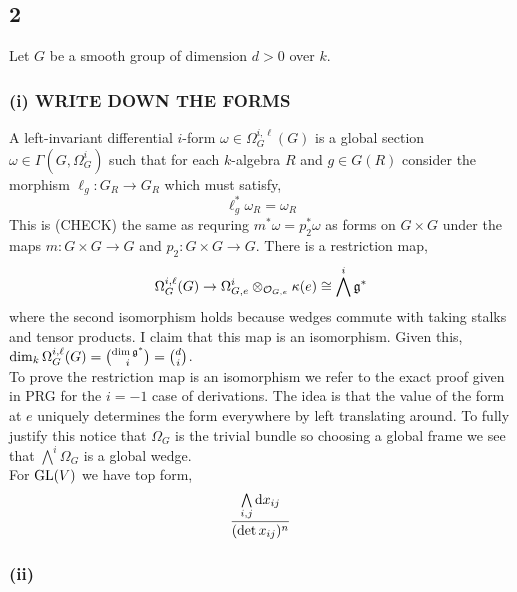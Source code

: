 \documentclass[12pt]{article}
\begin{document}
\subsection{2}

Let $G$ be a smooth group of dimension $d > 0$ over $k$.

\subsubsection{(i) WRITE DOWN THE FORMS}

A left-invariant differential $i$-form $\omega \in \Omega^{i, \ell}_{G}(G)$ is a global section $\omega \in \Gamma(G, \Omega^i_G)$ such that for each $k$-algebra $R$ and $g \in G(R)$ consider the morphism $\ell_g : G_R \to G_R$ which must satisfy,
\[ \ell_g^* \omega_R = \omega_R \]
This is (CHECK) the same as requring $m^* \omega = p_2^* \omega$ as forms on $G \times G$ under the maps $m : G \times G \to G$ and $p_2 : G \times G \to G$.
There is a restriction map,
\[ \Omega^{i, \ell}_{G}(G) \to \Omega^i_{G, e} \otimes_{\mathcal{O}_{G, e}} \kappa(e) \cong \bigwedge^i \mathfrak{g}^* \]
where the second isomorphism holds because wedges commute with taking stalks and tensor products. I claim that this map is an isomorphism. Given this, $\dim_k{\Omega^{i,\ell}_G(G)} = {\dim{\mathfrak{g}^*} \choose i} = {d \choose i}$. 
\bigskip\\
To prove the restriction map is an isomorphism we refer to the exact proof given in PRG for the $i = -1$ case of derivations. The idea is that the value of the form at $e$ uniquely determines the form everywhere by left translating around. To fully justify this notice that $\Omega_G$ is the trivial bundle so choosing a global frame we see that $\bigwedge^i \Omega_G$ is a global wedge.
\bigskip\\
For $\mathrm{GL}(V)$ we have top form,
\[ \frac{\bigwedge\limits_{i,j} \mathrm{d}{x_{ij}}}{(\det{x_{ij}})^n} \]

\subsubsection{(ii)}
\end{document}
